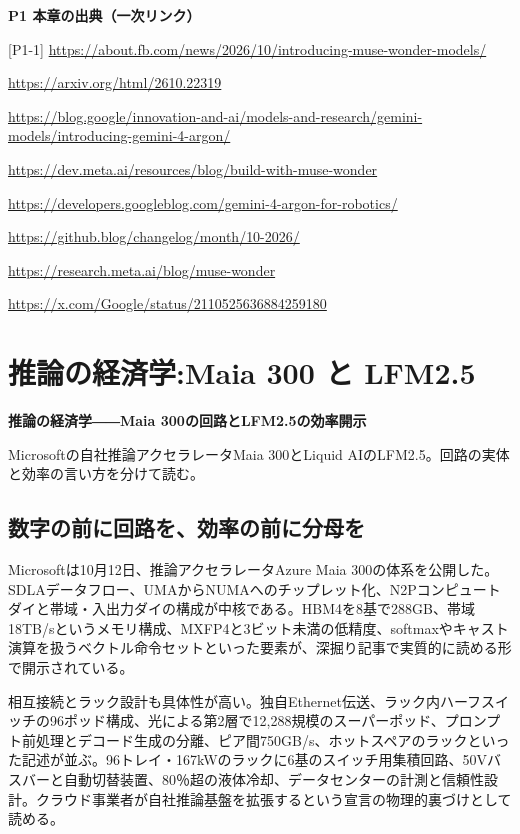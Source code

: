\documentclass[lualatex,a4paper,10pt]{jlreq}
\begin{document}
\begin{tcolorbox}[colback=white,colframe=SurveyRule,arc=1mm,boxrule=0.4pt,left=2mm,right=2mm]
\textbf{P1 本章の出典（一次リンク）}\par\footnotesize
[P1-1] \url{https://about.fb.com/news/2026/10/introducing-muse-wonder-models/}\par
[P1-2] \url{https://arxiv.org/html/2610.22319}\par
[P1-3] \url{https://blog.google/innovation-and-ai/models-and-research/gemini-models/introducing-gemini-4-argon/}\par
[P1-4] \url{https://dev.meta.ai/resources/blog/build-with-muse-wonder}\par
[P1-5] \url{https://developers.googleblog.com/gemini-4-argon-for-robotics/}\par
[P1-6] \url{https://github.blog/changelog/month/10-2026/}\par
[P1-7] \url{https://research.meta.ai/blog/muse-wonder}\par
[P1-8] \url{https://x.com/Google/status/2110525636884259180}\par
\end{tcolorbox}

\section{推論の経済学:Maia 300 と LFM2.5}
\label{sec:P2}

{\Large\bfseries 推論の経済学――Maia 300の回路とLFM2.5の効率開示\par}
\smallskip
{\color{SurveyMuted}Microsoftの自社推論アクセラレータMaia 300とLiquid AIのLFM2.5。回路の実体と効率の言い方を分けて読む。\par}
\bigskip

\subsection*{数字の前に回路を、効率の前に分母を}
Microsoftは10月12日、推論アクセラレータAzure Maia 300の体系を公開した。SDLAデータフロー、UMAからNUMAへのチップレット化、N2Pコンピュートダイと帯域・入出力ダイの構成が中核である。HBM4を8基で288GB、帯域18TB/sというメモリ構成、MXFP4と3ビット未満の低精度、softmaxやキャスト演算を扱うベクトル命令セットといった要素が、深掘り記事で実質的に読める形で開示されている。

相互接続とラック設計も具体性が高い。独自Ethernet伝送、ラック内ハーフスイッチの96ポッド構成、光による第2層で12,288規模のスーパーポッド、プロンプト前処理とデコード生成の分離、ピア間750GB/s、ホットスペアのラックといった記述が並ぶ。96トレイ・167kWのラックに6基のスイッチ用集積回路、50Vバスバーと自動切替装置、80％超の液体冷却、データセンターの計測と信頼性設計。クラウド事業者が自社推論基盤を拡張するという宣言の物理的裏づけとして読める。
\end{document}
